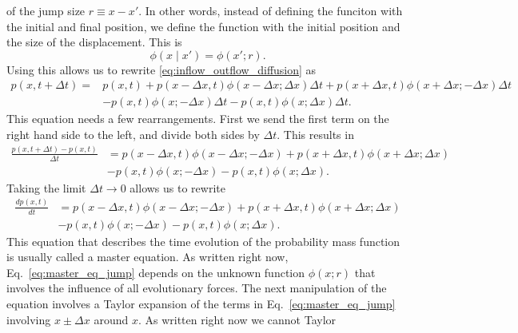 of the jump size $r \equiv x - x'$. In other words, instead of defining the
funciton with the initial and final position, we define the function with the
initial position and the size of the displacement. This is
\begin{equation}
    \phi(x \mid x') = \phi(x'; r).
\end{equation}
Using this allows us to rewrite \ref{eq:inflow_outflow_diffusion} as
\begin{equation}
\begin{split}
    p(x, t + \Delta t) = &p(x, t)
    + p(x - \Delta x, t) \phi(x - \Delta x; \Delta x)\Delta t
    + p(x + \Delta x, t) \phi(x + \Delta x; -\Delta x)\Delta t\\
    &- p(x, t) \phi(x; -\Delta x) \Delta t
    - p(x, t) \phi(x; \Delta x) \Delta t.
\end{split}
\label{eq:jump_diffusion}
\end{equation}
This equation needs a few rearrangements. First we send the first term on the
right hand side to the left, and divide both sides by $\Delta t$. This results
in
\begin{equation}
\begin{split}
    \frac{p(x, t + \Delta t) - p(x, t)}{\Delta t} &=
    p(x - \Delta x, t) \phi(x - \Delta x; -\Delta x)
    + p(x + \Delta x, t) \phi(x + \Delta x; \Delta x)\\
    &- p(x, t) \phi(x; -\Delta x) 
    - p(x, t) \phi(x; \Delta x).
\end{split}
\end{equation}
Taking the limit $\Delta t \rightarrow 0$ allows us to rewrite
\begin{equation}
\begin{split}
    \frac{d p(x, t)}{dt} &=
    p(x - \Delta x, t) \phi(x - \Delta x; -\Delta x)
    + p(x + \Delta x, t) \phi(x + \Delta x; \Delta x)\\
    &- p(x, t) \phi(x; -\Delta x) 
    - p(x, t) \phi(x; \Delta x).
\end{split}
\label{eq:master_eq_jump}
\end{equation}
This equation that describes the time evolution of the probability mass function
is usually called a master equation. As written right now,
Eq.~\ref{eq:master_eq_jump} depends on the unknown function $\phi(x; r)$ that
involves the influence of all evolutionary forces. The next manipulation of the
equation involves a Taylor expansion of the terms in Eq.~\ref{eq:master_eq_jump}
involving $x \pm \Delta x$ around $x$. As written right now we cannot Taylor
